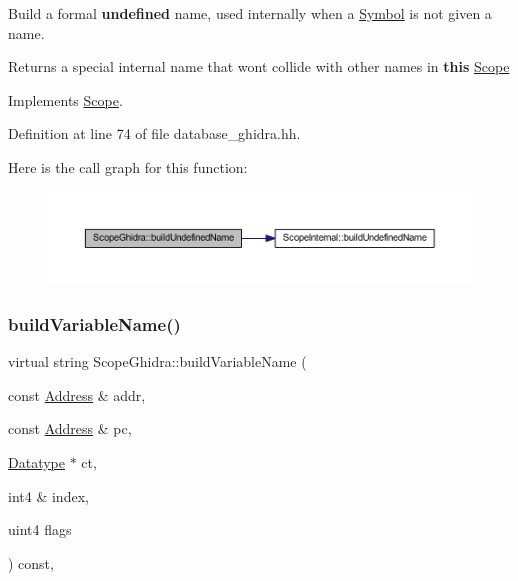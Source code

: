 Build a formal {\bfseries{undefined}} name, used internally when a \mbox{\hyperlink{class_symbol}{Symbol}} is not given a name. 

\begin{DoxyReturn}{Returns}
a special internal name that won\textquotesingle{}t collide with other names in {\bfseries{this}} \mbox{\hyperlink{class_scope}{Scope}} 
\end{DoxyReturn}


Implements \mbox{\hyperlink{class_scope_ac47d5c1c949be84a27a138be0febacb2}{Scope}}.



Definition at line 74 of file database\+\_\+ghidra.\+hh.

Here is the call graph for this function\+:
\nopagebreak
\begin{figure}[H]
\begin{center}
\leavevmode
\includegraphics[width=350pt]{class_scope_ghidra_a25f55a3495b08a4caafaaeb5c1cf8bed_cgraph}
\end{center}
\end{figure}
\mbox{\label{class_scope_ghidra_a4a8ab1c82c0d5101e7e2f5cdd5cc8268}} 
\subsubsection{\texorpdfstring{buildVariableName()}{buildVariableName()}}
{\footnotesize\ttfamily virtual string Scope\+Ghidra\+::build\+Variable\+Name (\begin{DoxyParamCaption}\item[{const \mbox{\hyperlink{class_address}{Address}} \&}]{addr,  }\item[{const \mbox{\hyperlink{class_address}{Address}} \&}]{pc,  }\item[{\mbox{\hyperlink{class_datatype}{Datatype}} $\ast$}]{ct,  }\item[{int4 \&}]{index,  }\item[{uint4}]{flags }\end{DoxyParamCaption}) const\hspace{0.3cm}{\ttfamily [inline]}, {\ttfamily [virtual]}}



